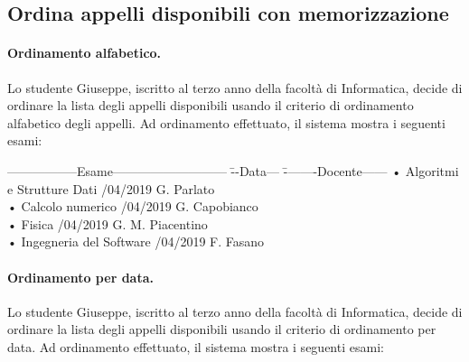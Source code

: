  
\subsection{Ordina appelli disponibili con memorizzazione}
\paragraph{Ordinamento alfabetico.}
Lo studente Giuseppe, iscritto al terzo anno della facoltà di Informatica, decide di ordinare la lista degli appelli disponibili usando il criterio di ordinamento alfabetico degli appelli. Ad ordinamento effettuato, il sistema mostra i seguenti esami:

\begin{tabbing}
	\hspace{1cm}-----------------Esame--------------------------- \= --Data--- \= --------Docente------ \kill
	\hspace{1cm} • Algoritmi e Strutture Dati /04/2019 \> \hspace{1cm} G. Parlato \\
	\hspace{1cm} • Calcolo numerico /04/2019  \> \hspace{1cm} G. Capobianco \\
	\hspace{1cm} • Fisica /04/2019 \> \hspace{1cm} G. M. Piacentino  \\
	\hspace{1cm} • Ingegneria del Software /04/2019   \> \hspace{1cm} F. Fasano \\
\end{tabbing}

\paragraph{Ordinamento per data.}
 Lo studente Giuseppe, iscritto al terzo anno della facoltà di Informatica, decide di ordinare la lista degli appelli disponibili usando il criterio di ordinamento per data. Ad ordinamento effettuato, il sistema mostra i seguenti esami:
 
